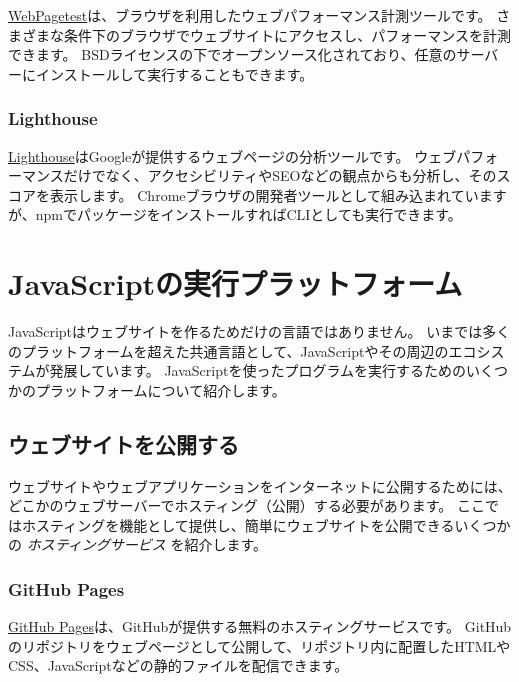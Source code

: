 \href{https://www.webpagetest.org/}{WebPagetest}は、ブラウザを利用したウェブパフォーマンス計測ツールです。
さまざまな条件下のブラウザでウェブサイトにアクセスし、パフォーマンスを計測できます。
BSDライセンスの下でオープンソース化されており、任意のサーバーにインストールして実行することもできます。

\hypertarget{lighthouse}{%
\subsubsection{Lighthouse}\label{lighthouse}}

\href{https://developers.google.com/web/tools/lighthouse/?hl=ja}{Lighthouse}はGoogleが提供するウェブページの分析ツールです。
ウェブパフォーマンスだけでなく、アクセシビリティやSEOなどの観点からも分析し、そのスコアを表示します。
Chromeブラウザの開発者ツールとして組み込まれていますが、npmでパッケージをインストールすればCLIとしても実行できます。

\hypertarget{javascript-platform}{%
\section{JavaScriptの実行プラットフォーム}\label{javascript-platform}}

JavaScriptはウェブサイトを作るためだけの言語ではありません。
いまでは多くのプラットフォームを超えた共通言語として、JavaScriptやその周辺のエコシステムが発展しています。
JavaScriptを使ったプログラムを実行するためのいくつかのプラットフォームについて紹介します。

\hypertarget{publishing-website}{%
\subsection{ウェブサイトを公開する}\label{publishing-website}}

ウェブサイトやウェブアプリケーションをインターネットに公開するためには、どこかのウェブサーバーでホスティング（公開）する必要があります。
ここではホスティングを機能として提供し、簡単にウェブサイトを公開できるいくつかの
\emph{ホスティングサービス} を紹介します。

\hypertarget{github-pages}{%
\subsubsection{GitHub Pages}\label{github-pages}}

\href{https://pages.github.com/}{GitHub
Pages}は、GitHubが提供する無料のホスティングサービスです。
GitHubのリポジトリをウェブページとして公開して、リポジトリ内に配置したHTMLやCSS、JavaScriptなどの静的ファイルを配信できます。

